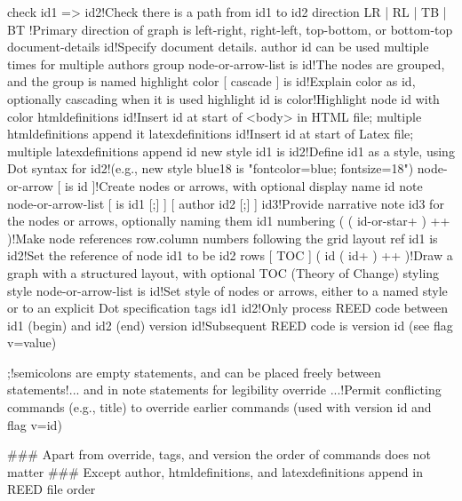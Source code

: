 check id1 => id2!Check there is a path from id1 to id2
direction { LR | RL | TB | BT }!Primary direction of graph is left-right, right-left, top-bottom, or bottom-top
document-details id!Specify document details. author id can be used multiple times for multiple authors
group node-or-arrow-list is id!The nodes are grouped, and the group is named
highlight color [ cascade ] is id!Explain color as id, optionally cascading when it is used
highlight id is color!Highlight node id with color
htmldefinitions id!Insert id at start of <body> in HTML file; multiple htmldefinitions append it
latexdefinitions id!Insert id at start of Latex file; multiple latexdefinitions append id 
new style id1 is id2!Define id1 as a style, using Dot syntax for id2!(e.g., new style blue18 is "fontcolor=blue; fontsize=18")
node-or-arrow [ is id ]!Create nodes or arrows, with optional display name id
note node-or-arrow-list [ is id1 [;] ] [ author id2 [;] ] id3!Provide narrative note id3 for the nodes or arrows, optionally naming them id1
numbering ( { ( id-or-star+ ) }++ )!Make node references row.column numbers following the grid layout
ref id1 is id2!Set the reference of node id1 to be id2
rows [ TOC ] ( { id ( id+ ) }++ )!Draw a graph with a structured layout, with optional TOC (Theory of Change) styling
style node-or-arrow-list is id!Set style of nodes or arrows, either to a named style or to an explicit Dot specification
tags id1 id2!Only process REED code between id1 (begin) and id2 (end)
version id!Subsequent REED code is version id (see flag v=value)

;!semicolons are empty statements, and can be placed freely between statements!... and in note statements for legibility
override ...!Permit conflicting commands (e.g., title) to override earlier commands (used with version id and flag v=id)

### Apart from override, tags, and version the order of commands does not matter
### Except author, htmldefinitions, and latexdefinitions append in REED file order

